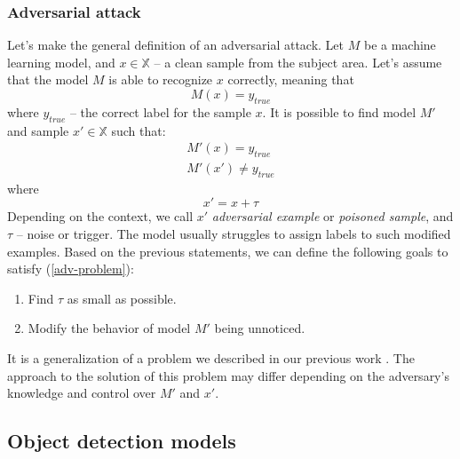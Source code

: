 \documentclass[14pt,a4paper]{extarticle}
\newcounter{e}
\numberwithin{equation}{section}
\numberwithin{figure}{section}
\begin{document}
\subsubsection{Adversarial attack}
Let's make the general definition of an adversarial attack. Let $M$ be a machine learning model, and $x \in \mathbb{X}$ -- a clean sample from the subject area. Let's assume that the model $M$ is able to recognize $x$ correctly, meaning that
\begin{equation}
M(x)=y_{true }
\end{equation}
where $y_{true }$ -- the correct label for the sample $x$. It is possible to find model $M'$ and sample $x' \in \mathbb{X}$ such that:
\begin{equation}
\label{adv-problem}
\begin{gathered}
M'\left(x\right) = y_{true} \\
M'\left(x'\right) \neq y_{true}
\end{gathered}
\end{equation}
where
\begin{equation}
x'=x+\tau
\end{equation}
Depending on the context, we call $x'$ \textit{adversarial example} or \textit{poisoned sample}, and $\tau$ -- noise or trigger. The model usually struggles to assign labels to such modified examples. Based on the previous statements, we can define the following goals to satisfy (\ref{adv-problem}):
\begin{enumerate}
    \item Find $\tau$ as small as possible.
    \item Modify the behavior of model $M'$ being unnoticed.
\end{enumerate}
It is a generalization of a problem we described in our previous work \cite{buhrii-adv}. The approach to the solution of this problem may differ depending on the adversary's knowledge and control over $M'$ and $x'$.

\subsection{Object detection models}
\end{document}
